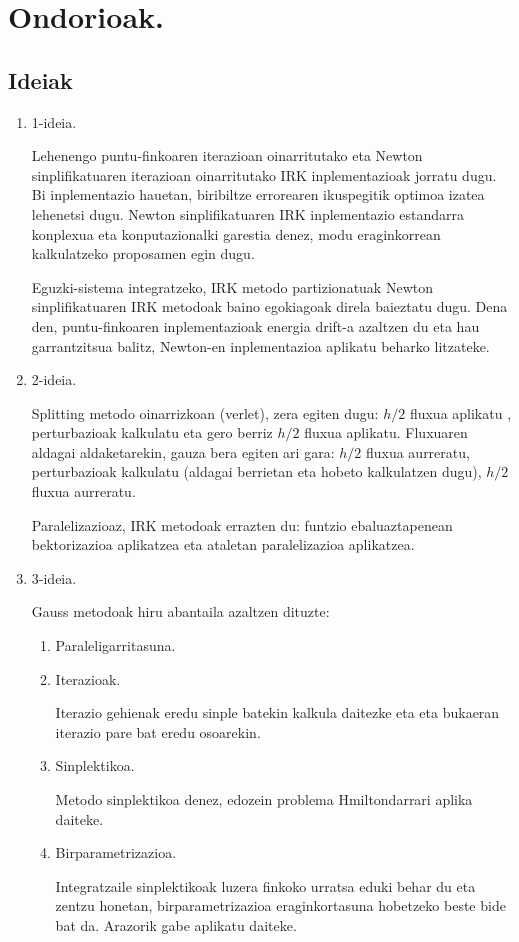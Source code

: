 \chapter{Ondorioak.}


\section*{Ideiak}

\begin{enumerate}
\item 1-ideia.

Lehenengo puntu-finkoaren iterazioan oinarritutako eta Newton sinplifikatuaren iterazioan oinarritutako IRK inplementazioak jorratu dugu. Bi inplementazio hauetan, biribiltze errorearen ikuspegitik optimoa izatea lehenetsi dugu. Newton sinplifikatuaren IRK inplementazio estandarra konplexua eta konputazionalki garestia denez, modu eraginkorrean kalkulatzeko proposamen egin dugu.

Eguzki-sistema integratzeko, IRK metodo partizionatuak Newton sinplifikatuaren IRK metodoak baino egokiagoak direla baieztatu dugu. Dena den, puntu-finkoaren inplementazioak energia drift-a azaltzen du eta hau garrantzitsua balitz, Newton-en inplementazioa aplikatu beharko litzateke.        

\item 2-ideia.

Splitting metodo oinarrizkoan (verlet), zera egiten dugu: $h/2$ fluxua aplikatu , perturbazioak kalkulatu eta gero berriz  $h/2$ fluxua aplikatu. Fluxuaren aldagai aldaketarekin, gauza bera egiten ari gara: $h/2$ fluxua aurreratu, perturbazioak kalkulatu (aldagai berrietan eta hobeto kalkulatzen dugu), $h/2$ fluxua aurreratu.

Paralelizazioaz, IRK metodoak errazten du: funtzio ebaluaztapenean bektorizazioa aplikatzea eta ataletan paralelizazioa aplikatzea.

\item 3-ideia.

Gauss metodoak hiru abantaila azaltzen dituzte:

\begin{enumerate}
\item Paraleligarritasuna.

\item Iterazioak.

Iterazio gehienak eredu sinple batekin kalkula daitezke \cite{Beylkin2014} eta eta bukaeran iterazio pare bat eredu osoarekin. 

\item Sinplektikoa.

Metodo sinplektikoa denez, edozein problema Hmiltondarrari aplika daiteke. 

\item Birparametrizazioa.

Integratzaile sinplektikoak luzera finkoko urratsa eduki behar du eta zentzu honetan, birparametrizazioa eraginkortasuna hobetzeko beste bide bat da. Arazorik gabe aplikatu daiteke.


\end{enumerate}



\end{enumerate}
